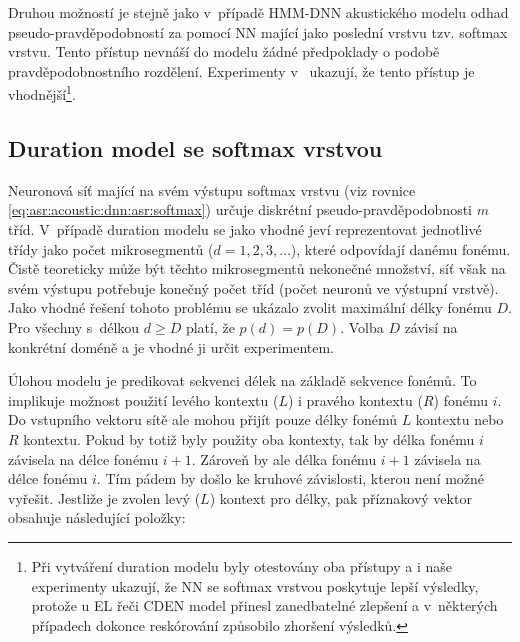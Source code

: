 Druhou možností je stejně jako v~případě HMM-DNN akustického modelu odhad pseudo-pravděpodobností za pomocí NN mající jako poslední vrstvu tzv. softmax vrstvu. Tento přístup nevnáší do modelu žádné předpoklady o podobě pravděpodobnostního rozdělení. Experimenty v~\cite{Hadian2017} ukazují, že tento přístup je vhodnější\footnote{Při vytváření duration modelu byly otestovány oba přístupy a i naše experimenty ukazují, že NN se softmax vrstvou poskytuje lepší výsledky, protože u EL řeči CDEN model přinesl zanedbatelné zlepšení a v~některých případech dokonce reskórování způsobilo zhoršení výsledků.}.

\subsection{Duration model se softmax vrstvou}
\label{chap:realisation:durationmodels:nn:softmax}

Neuronová síť mající na svém výstupu softmax vrstvu (viz rovnice \ref{eq:asr:acoustic:dnn:asr:softmax}) určuje diskrétní pseudo-pravděpodobnosti $m$ tříd. V~případě duration modelu se jako vhodné jeví reprezentovat jednotlivé třídy jako počet mikrosegmentů ($d=1,2,3,\dots$), které odpovídají danému fonému. Čistě teoreticky může být těchto mikrosegmentů nekonečné množství, síť však na svém výstupu potřebuje konečný počet tříd (počet neuronů ve výstupní vrstvě). Jako vhodné řešení tohoto problému se ukázalo zvolit maximální délky fonému $D$. Pro všechny s~délkou $d \geq D$ platí, že $p\left(d\right) = p\left(D\right)$. \cite{Hadian2017} Volba $D$ závisí na konkrétní doméně a je vhodné ji určit experimentem.

Úlohou modelu je predikovat sekvenci délek na základě sekvence fonémů. To implikuje možnost použití levého kontextu ($L$) i pravého kontextu ($R$) fonému $i$. Do vstupního vektoru sítě ale mohou přijít pouze délky fonémů $L$ kontextu  nebo $R$ kontextu. Pokud by totiž byly použity oba kontexty, tak by délka fonému $i$ závisela na délce fonému $i+1$. Zároveň by ale délka fonému $i+1$ závisela na délce fonému $i$. Tím pádem by došlo ke kruhové závislosti, kterou není možné vyřešit. Jestliže je zvolen levý ($L$) kontext pro délky, pak příznakový vektor obsahuje následující položky:

